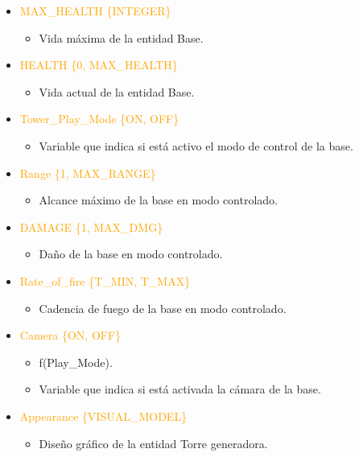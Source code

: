 \documentclass{article}
\begin{document}
\begin{itemize}
    \item \textcolor{Orange}{MAX\_HEALTH \{INTEGER\}}
    \begin{itemize}
        \item Vida máxima de la entidad Base.
    \end{itemize}
    \item \textcolor{Orange}{HEALTH \{0, MAX\_HEALTH\}}
    \begin{itemize}
        \item Vida actual de la entidad Base.
    \end{itemize}
    \item \textcolor{Orange}{Tower\_Play\_Mode \{ON, OFF\}}
    \begin{itemize}
        \item Variable que indica si está activo el modo de control de la base.
    \end{itemize}
    \item \textcolor{Orange}{Range \{1, MAX\_RANGE\}}
    \begin{itemize}
        \item Alcance máximo de la base en modo controlado.
    \end{itemize}
    \item \textcolor{Orange}{DAMAGE \{1, MAX\_DMG\}}
    \begin{itemize}
        \item Daño de la base en modo controlado.
    \end{itemize}
    \item \textcolor{Orange}{Rate\_of\_fire \{T\_MIN, T\_MAX\}}
    \begin{itemize}
        \item Cadencia de fuego de la base en modo controlado.
    \end{itemize}
    \item \textcolor{Orange}{Camera \{ON, OFF\}}
    \begin{itemize}
        \item f(Play\_Mode).
        \item Variable que indica si está activada la cámara de la base.
    \end{itemize}
     \item \textcolor{Orange}{Appearance \{VISUAL\_MODEL\}}
    \begin{itemize}
        \item Diseño gráfico de la entidad Torre generadora.
    \end{itemize}
\end{itemize}
\end{document}
